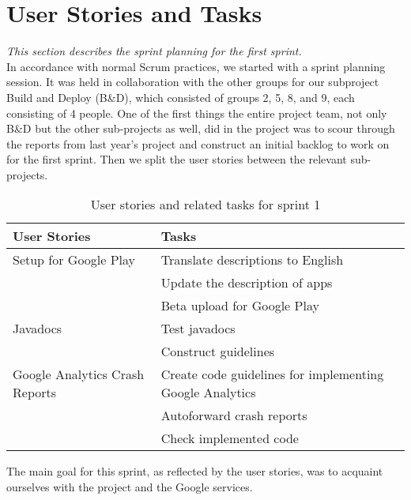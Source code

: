 \section{User Stories and Tasks} \label{Sprint1_SecUserStoriesAndTasks}
\textit{This section describes the sprint planning for the first sprint.}\\
In accordance with normal Scrum practices, we started with a sprint planning session. It was held in collaboration with the other groups for our subproject Build and Deploy (B\&D), which consisted of groups 2, 5, 8, and 9, each consisting of 4 people. One of the first things the entire project team, not only B\&D but the other sub-projects as well, did in the project was to scour through the reports from last year's project and construct an initial backlog to work on for the first sprint. Then we split the user stories between the relevant sub-projects.

\begin{table}[H]
	\centering
	\begin{tabular}{ll}
		\textbf{User Stories} & \textbf{Tasks}\\ \hline \noalign{\vskip 2mm}
		Setup for Google Play & Translate descriptions to English\\
		& Update the description of apps\\
		& Beta upload for Google Play\\ \hline
		Javadocs & Test javadocs\\
		& Construct guidelines\\ \hline
		Google Analytics Crash Reports & Create code guidelines for implementing Google Analytics\\
		& Autoforward crash reports\\
		& Check implemented code\\ \hline
	\end{tabular}
	\caption{User stories and related tasks for sprint 1}
	\label{Sprint1_UserStories2_table}
\end{table}

The main goal for this sprint, as reflected by the user stories, was to acquaint ourselves with the project and the Google services.\\